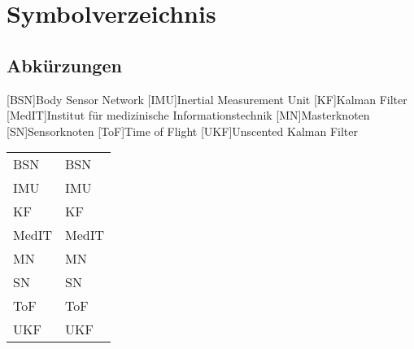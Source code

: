 \chapter*{Symbolverzeichnis}										%



\section*{Abkürzungen}


[BSN]{Body Sensor Network}
[IMU]{Inertial Measurement Unit}
[KF]{Kalman Filter}
[MedIT]{Institut f{\"u}r medizinische Informationstechnik}
[MN]{Masterknoten}
[SN]{Sensorknoten}
[ToF]{Time of Flight}
[UKF]{Unscented Kalman Filter}



\begin{tabularx}{\textwidth}{p{}X}
\acs{BSN} & \acl{BSN} \\
\acs{IMU} &\acl{IMU} \\
\acs{KF} & \acl{KF} \\
\acs{MedIT} & \acl{MedIT} \\
\acs{MN} & \acl{MN} \\
\acs{SN} & \acl{SN} \\
\acs{ToF} & \acl{ToF} \\
\acs{UKF} & \acl{UKF} \\
\end{tabularx}
